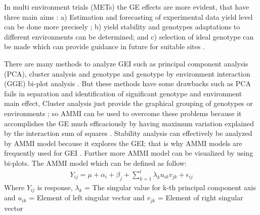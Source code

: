 In multi environment trials (METs) the GE effects are more evident,  that have three main aims
: a) Estimation and forecasting of experimental data yield level can be done more precisely  ; b) yield stability and genotypes adaptations to different environments can be determined; and c) selection of ideal genotype can be made which can provide guidance in future for suitable sites \citep{Crossa1990}.

There are many methods to analyze GEI such as principal component analysis (PCA), cluster analysis and genotype and genotype by environment interaction (GGE) bi-plot analysis \citep{Yan2005}. But these methods have some drawbacks such as PCA fails in separation and identification of significant genotype and environment main effect, Cluster analysis just provide the graphical grouping of genotypes or environments ; so AMMI can be used to overcome these problems because it accomplishes the GE much efficaciously by having maximum variation explained by the interaction sum of squares \citep{Zobel1988}. Stability analysis can effectively be analyzed by AMMI model because it explores the GEI; that is why AMMI models are frequently used for GEI \citep{Crossa1990}. Further more AMMI model can be visualized by using bi-plots. The AMMI model which can be defined as follow:
\begin{eqnarray}
Y_{ij}=\mu+\alpha_i +\beta_j+\sum_{k=1}^t \lambda_k u_{ik}v_{jk}+\epsilon_{ij} 
\end{eqnarray}
Where $Y_{ij}$ is response, $\lambda_k$ = The singular value for k-th principal component axis and $u_{ik}$ = Element of left singular vector and  $v_{jk}$ = Element of right singular vector

